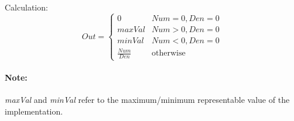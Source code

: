 Calculation:
\begin{equation*}
	Out = \begin{cases}0 & Num=0, Den = 0\\ maxVal & Num > 0, Den=0\\ minVal & Num < 0, Den =0\\ \frac{Num}{Den} & \text{otherwise} \end{cases}
\end{equation*}
\paragraph{Note:}\textit{maxVal} and \textit{minVal} refer to the maximum/minimum representable value of the implementation.

